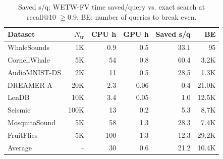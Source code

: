\begin{table}[t]
\centering
\caption{Saved s/q: \textsc{WETW-FV} time saved/query vs. exact search at recall@10 $\geq0.9$. BE: number of queries to break even.}
\label{tab:offline_cost}
\footnotesize
\setlength{\tabcolsep}{2pt}
\begin{tabular*}{\columnwidth}{@{\extracolsep{\fill}}lrrrrr@{}}
\toprule
Dataset & $N_{\mathrm{tr}}$ & CPU h & GPU h & Saved s/q & BE \\
\midrule
WhaleSounds & 1K & 0.9 & 0.5 & 33.1 & 95 \\
CornellWhale & 5K & 54 & 0.8 & 60.4 & 3.2K \\
AudioMNIST-DS & 2K & 11 & 0.5 & 28.5 & 1.3K \\
DREAMER-A & 20K & 2.3 & 0.06 & 0.4 & 21.0K \\
LenDB & 10K & 3.4 & 0.05 & 1.0 & 12.5K \\
Seismic & 100K & 13 & 0.2 & 5.3 & 8.7K \\
MosquitoSound & 5K & 58 & 1.3 & 28.3 & 7.4K \\
FruitFlies & 5K & 100 & 1.3 & 12.3 & 29.2K \\
\midrule
Average & -- & 30 & 0.6 & 21.2 & 10.4K \\
\bottomrule
\end{tabular*}
\end{table}
